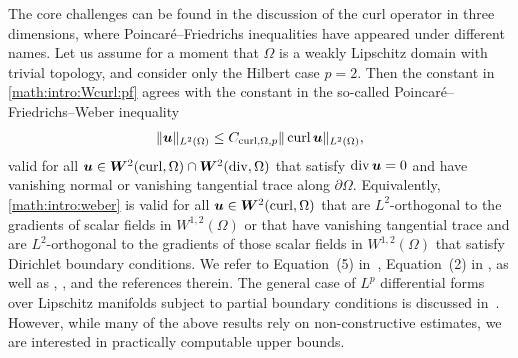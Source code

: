 \documentclass[10pt,a4paper]{article}
\begin{document}
The core challenges can be found in the discussion of the curl operator in three dimensions,
where Poincar\'e--Friedrichs inequalities have appeared under different names. 
Let us assume for a moment that $\Omega$ is a weakly Lipschitz domain with trivial topology, and consider only the Hilbert case $p=2$. 
Then the constant in \eqref{math:intro:Wcurl:pf} agrees with the constant in the so-called Poincar\'e--Friedrichs--Weber inequality
\begin{align}
    \label{math:intro:weber}
    \| \bm{u}\|_{L^{2}(\Omega)}   \leq C_{\operatorname{curl},\Omega,p} \| \operatorname{curl} \bm{u} \|_{L^{2}(\Omega)},
\end{align}
valid for all $\bm{u} \in \bm{W}^{2}(\operatorname{curl},\Omega) \cap \bm{W}^{2}(\operatorname{div},\Omega)$ that satisfy $\operatorname{div} \bm{u} = 0$ and have vanishing normal or vanishing tangential trace along $\partial \Omega$. 
Equivalently, \eqref{math:intro:weber} is valid for all $\bm{u} \in \bm{W}^{2}(\operatorname{curl},\Omega)$ that are $L^{2}$-orthogonal to the gradients of scalar fields in $W^{1,2}(\Omega)$
or that have vanishing tangential trace and are $L^{2}$-orthogonal to the gradients of those scalar fields in $W^{1,2}(\Omega)$ that satisfy Dirichlet boundary conditions.
We refer to Equation~(5) in~\cite{Fried_diff_forms_55}, Equation~(2) in \cite{Gaff_Hilbert_harm_55}, \cite{Web_compact_Maxw_80} as well as \cite[Lemmas~3.4 and~3.6]{Gir_Rav_NS_86}, \cite[Proposition~7.4]{Fer_Gil_Maxw_BC_97}, and the references therein. 
The general case of $L^p$ differential forms over Lipschitz manifolds subject to partial boundary conditions is discussed in~\cite{goldshtein2011hodge}.
However, while many of the above results rely on non-constructive estimates, 
we are interested in practically computable upper bounds. 
\end{document}
